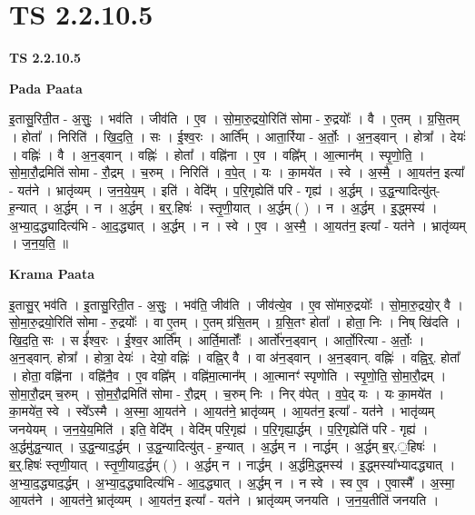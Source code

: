 \documentclass[17pt]{extarticle}
\begin{document}
\section{ TS 2.2.10.5 }

\textbf{TS 2.2.10.5 } \newline

\textbf{Pada Paata} \newline

इ॒तासु॒रिती॒त - अ॒सुः॒ । भव॑ति । जीव॑ति । ए॒व । सो॒मा॒रु॒द्रयो॒रिति॑ सोमा - रु॒द्रयोः᳚ । वै । ए॒तम् । ग्र॒सि॒तम् । होता᳚ । निरिति॑ । खि॒द॒ति॒ । सः । ई॒श्व॒रः । आर्ति᳚म् । आता॒र्रिया - अ॒र्तोः॒ । अ॒न॒ड्वान् । होत्रा᳚ । देयः॑ । वह्निः॑ । वै । अ॒न॒ड्वान् । वह्निः॑ । होता᳚ । वह्नि॑ना । ए॒व । वह्नि᳚म् । आ॒त्मान᳚म् । स्पृ॒णो॒ति॒ । सो॒मा॒रौ॒द्रमिति॑ सोमा - रौ॒द्रम् । च॒रुम् । निरिति॑ । व॒पे॒त् । यः । का॒मये॑त । स्वे । अ॒स्मै॒ । आ॒यत॑न॒ इत्या᳚ - यत॑ने । भ्रातृ॑व्यम् । ज॒न॒ये॒य॒म् । इति॑ । वेदि᳚म् । प॒रि॒गृह्येति॑ परि - गृह्य॑ । अ॒र्द्धम् । उ॒द्ध॒न्यादित्यु॑त्-ह॒न्यात् । अ॒र्द्धम् । न । अ॒र्द्धम् । ब॒र्॒.हिषः॑ । स्तृ॒णी॒यात् । अ॒र्द्धम् ( ) । न । अ॒र्द्धम् । इ॒॒द्ध्मस्य॑ । अ॒भ्या॒द॒द्ध्यादित्य॑भि - आ॒द॒द्ध्यात् । अ॒र्द्धम् । न । स्वे । ए॒व । अ॒स्मै॒ । आ॒यत॑न॒ इत्या᳚ - यत॑ने । भ्रातृ॑व्यम् । ज॒न॒य॒ति॒ ॥  \newline


\textbf{Krama Paata} \newline

इ॒तासु॒र् भव॑ति । इ॒तासु॒रिती॒त - अ॒सुः॒ । भव॑ति॒ जीव॑ति । जीव॑त्ये॒व । ए॒व सो॑मारु॒द्रयोः᳚ । सो॒मा॒रु॒द्रयो॒र् वै । सो॒मा॒रु॒द्रयो॒रिति॑ सोमा - रु॒द्रयोः᳚ । वा ए॒तम् । ए॒तम् ग्र॑सि॒तम् । ग्र॒सि॒तꣳ होता᳚ । होता॒ निः । निष् खि॑दति । खि॒द॒ति॒ सः । स ई᳚श्व॒रः । ई॒श्व॒र आर्ति᳚म् । आर्ति॒मार्तोः᳚ । आर्तो॑रन॒ड्वान् । आर्तो॒रित्या - अ॒र्तोः॒ । अ॒न॒ड्वान्. होत्रा᳚ । होत्रा॒ देयः॑ । देयो॒ वह्निः॑ । वह्नि॒र् वै । वा अ॑न॒ड्वान् । अ॒न॒ड्वान्. वह्निः॑ । वह्नि॒र्॒. होता᳚ । होता॒ वह्नि॑ना । वह्नि॑नै॒व । ए॒व वह्नि᳚म् । वह्नि॑मा॒त्मान᳚म् । आ॒त्मानꣳ॑ स्पृणोति । स्पृ॒णो॒ति॒ सो॒मा॒रौ॒द्रम् । सो॒मा॒रौ॒द्रम् च॒रुम् । सो॒म॒रौ॒द्रमिति॑ सोमा - रौ॒द्रम् । च॒रुम् निः । निर् व॑पेत् । व॒पे॒द् यः । यः का॒मये॑त । का॒मये॑त॒ स्वे । स्वे᳚ऽस्मै । अ॒स्मा॒ आ॒यत॑ने । आ॒यत॑ने॒ भ्रातृ॑व्यम् । आ॒यत॑न॒ इत्या᳚ - यत॑ने । भातृ॑व्यम् जनयेयम् । ज॒न॒ये॒य॒मिति॑ । इति॒ वेदि᳚म् । वेदि॑म् परि॒गृह्य॑ । प॒रि॒गृह्या॒र्द्धम् । प॒रि॒गृह्येति॑ परि - गृह्य॑ । अ॒र्द्धमु॑द्ध॒न्यात् । उ॒द्ध॒न्याद॒र्द्धम् । उ॒द्ध॒न्यादित्यु॑त् - ह॒न्यात् । अ॒र्द्धम् न । नार्द्धम् । अ॒र्द्धम् ब॒र्.॒हिषः॑ । ब॒र्॒.हिषः॑ स्तृणी॒यात् । स्तृ॒णी॒याद॒र्द्धम् ( ) । अ॒र्द्धम् न । नार्द्धम् । अ॒र्द्धमि॒द्ध्मस्य॑ । इ॒द्ध्मस्या᳚भ्यादद्ध्यात् । अ॒भ्या॒द॒द्ध्याद॒र्द्धम् । अ॒भ्या॒द॒द्ध्यादित्य॑भि - आ॒द॒द्ध्यात् । अ॒र्द्धम् न । न स्वे । स्व ए॒व । ए॒वास्मै᳚ । अ॒स्मा॒ आ॒यत॑ने । आ॒यत॑ने॒ भ्रातृ॑व्यम् । आ॒यत॑न॒ इत्या᳚ - यत॑ने । भ्रातृ॑व्यम् जनयति । ज॒न॒य॒तीति॑ जनयति । \newline
\end{document}
